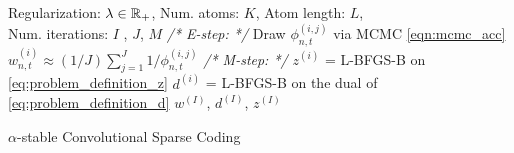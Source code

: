 
 
%


    \begin{algorithm}[H]
      \begin{algorithmic}[1] %
      \REQUIRE Regularization: $\lambda \in \mathbb{R}_+$, Num. atoms: $K$, Atom length: $L$, \\ Num. iterations: $I$ , $J$, $M$
          \STATE \textit{\color{blue} /* E-step: */} %
          \STATE Draw $\phi_{n,t}^{(i,j)}$ via MCMC \eqref{eqn:mcmc_acc}
          \ENDFOR
          \STATE $w_{n,t}^{(i)} \approx (1/J) \sum\nolimits_{j=1}^{J} 1/{\phi_{n,t}^{(i,j)}}$
          \STATE \textit{\color{blue} /* M-step: */} %
                  \STATE $z^{(i)}$ = L-BFGS-B on \eqref{eq:problem_definition_z}
                  \STATE $d^{(i)}$ = L-BFGS-B on the dual of \eqref{eq:problem_definition_d}
              \ENDFOR
        \ENDFOR
        \RETURN $w^{(I)}$, $d^{(I)}$, $z^{(I)}$
        \end{algorithmic}
        \caption{$\alpha$-stable Convolutional Sparse Coding}
        \label{alg:alpha_csc}
    \end{algorithm}

